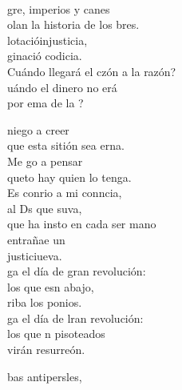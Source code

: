 \begin{cancion}%
	    \\
	gre, imperios y canes\\
	olan la historia de los bres.\\
	lotacióinjusticia,\\
	ginació codicia.\\
	Cuándo llegará el czón a la razón?\\
	uándo el dinero no erá \\
	por ema de la ? \jump\\
	\begin{chorus}%
		 niego a creer\\
		que esta sitión sea erna.\\
		Me go a pensar \\
		queto hay quien lo tenga.\\
		Es conrio a mi conncia,\\
		al Ds que suva,\\
		que ha insto en cada ser mano\\
		entrañae un\\
		justiciueva.   \\
	\jump
		ga el día de gran revolución:\\
		los que esn abajo,  \\
		riba los ponios.\\
		ga el día de lran revolución:\\
		los que n pisoteados \\
		virán resurreón.\jump\\
	\end{chorus}%
	\jump
	bas antipersles,\\

\end{cancion}
